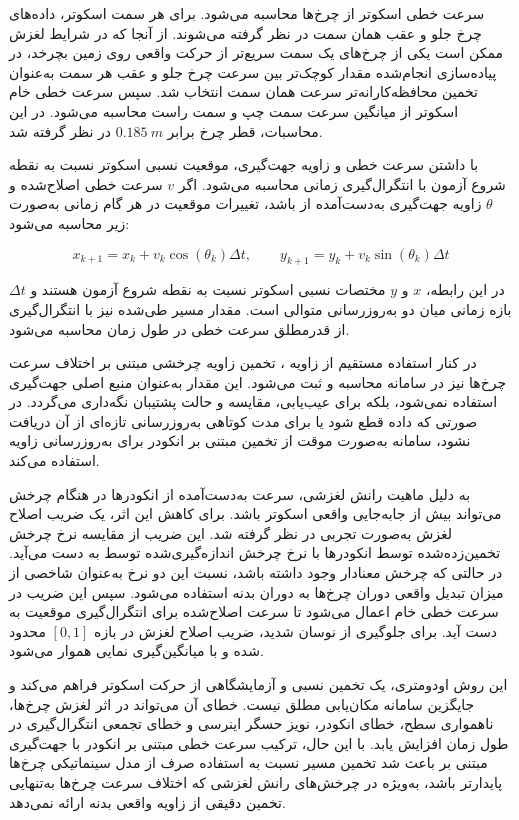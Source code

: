 سرعت خطی اسکوتر از  چرخ‌ها محاسبه می‌شود. برای هر سمت اسکوتر، داده‌های چرخ جلو و عقب همان سمت در نظر گرفته می‌شوند. از آنجا که در شرایط لغزش ممکن است یکی از چرخ‌های یک سمت سریع‌تر از حرکت واقعی روی زمین بچرخد، در پیاده‌سازی انجام‌شده مقدار کوچک‌تر بین سرعت چرخ جلو و عقب هر سمت به‌عنوان تخمین محافظه‌کارانه‌تر سرعت همان سمت انتخاب شد. سپس سرعت خطی خام اسکوتر از میانگین سرعت سمت چپ و سمت راست محاسبه می‌شود. در این محاسبات، قطر چرخ برابر $0.185~m$ در نظر گرفته شد.

با داشتن سرعت خطی و زاویه جهت‌گیری، موقعیت نسبی اسکوتر نسبت به نقطه شروع آزمون با انتگرال‌گیری زمانی محاسبه می‌شود. اگر $v$ سرعت خطی اصلاح‌شده و $\theta$ زاویه جهت‌گیری به‌دست‌آمده از  باشد، تغییرات موقعیت در هر گام زمانی به‌صورت زیر محاسبه می‌شود:

\begin{equation}
	x_{k+1} = x_k + v_k \cos(\theta_k)\Delta t,
	\qquad
	y_{k+1} = y_k + v_k \sin(\theta_k)\Delta t
	\label{eq:real_odom_position_update}
\end{equation}

در این رابطه، $x$ و $y$ مختصات نسبی اسکوتر نسبت به نقطه شروع آزمون هستند و $\Delta t$ بازه زمانی میان دو به‌روزرسانی متوالی است. مقدار مسیر طی‌شده نیز با انتگرال‌گیری از قدرمطلق سرعت خطی در طول زمان محاسبه می‌شود.

در کنار استفاده مستقیم از زاویه ، تخمین زاویه چرخشی مبتنی بر اختلاف سرعت چرخ‌ها نیز در سامانه محاسبه و ثبت می‌شود. این مقدار به‌عنوان منبع اصلی جهت‌گیری استفاده نمی‌شود، بلکه برای عیب‌یابی، مقایسه و حالت پشتیبان نگه‌داری می‌گردد. در صورتی که داده  قطع شود یا برای مدت کوتاهی به‌روزرسانی تازه‌ای از آن دریافت نشود، سامانه به‌صورت موقت از تخمین مبتنی بر انکودر برای به‌روزرسانی زاویه استفاده می‌کند.

به دلیل ماهیت رانش لغزشی، سرعت به‌دست‌آمده از انکودرها در هنگام چرخش می‌تواند بیش از جابه‌جایی واقعی اسکوتر باشد. برای کاهش این اثر، یک ضریب اصلاح لغزش به‌صورت تجربی در نظر گرفته شد. این ضریب از مقایسه نرخ چرخش تخمین‌زده‌شده توسط انکودرها با نرخ چرخش اندازه‌گیری‌شده توسط  به دست می‌آید. در حالتی که چرخش معنادار وجود داشته باشد، نسبت این دو نرخ به‌عنوان شاخصی از میزان تبدیل واقعی دوران چرخ‌ها به دوران بدنه استفاده می‌شود. سپس این ضریب در سرعت خطی خام اعمال می‌شود تا سرعت اصلاح‌شده برای انتگرال‌گیری موقعیت به دست آید. برای جلوگیری از نوسان شدید، ضریب اصلاح لغزش در بازه $[0,1]$ محدود شده و با میانگین‌گیری نمایی هموار می‌شود.

این روش اودومتری، یک تخمین نسبی و آزمایشگاهی از حرکت اسکوتر فراهم می‌کند و جایگزین سامانه مکان‌یابی مطلق نیست. خطای آن می‌تواند در اثر لغزش چرخ‌ها، ناهمواری سطح، خطای انکودر، نویز حسگر اینرسی و خطای تجمعی انتگرال‌گیری در طول زمان افزایش یابد. با این حال، ترکیب سرعت خطی مبتنی بر انکودر با جهت‌گیری مبتنی بر  باعث شد تخمین مسیر نسبت به استفاده صرف از مدل سینماتیکی چرخ‌ها پایدارتر باشد، به‌ویژه در چرخش‌های رانش لغزشی که اختلاف سرعت چرخ‌ها به‌تنهایی تخمین دقیقی از زاویه واقعی بدنه ارائه نمی‌دهد.

